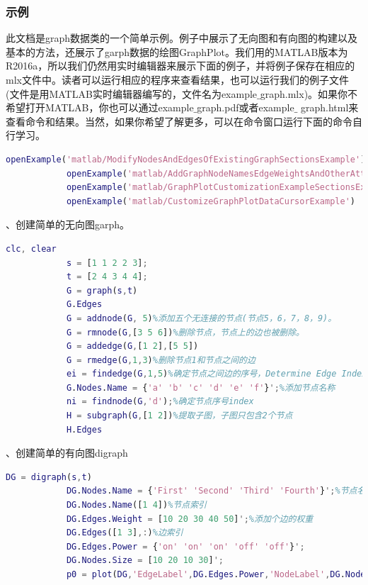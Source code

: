         \subsubsection{示例}
            \par
            此文档是graph数据类的一个简单示例。例子中展示了无向图和有向图的构建以及基本的方法，还展示了garph数据的绘图GraphPlot。我们用的MATLAB版本为R2016a，所以我们仍然用实时编辑器来展示下面的例子，并将例子保存在相应的mlx文件中。读者可以运行相应的程序来查看结果，也可以运行我们的例子文件(文件是用MATLAB实时编辑器编写的，文件名为example${\_}$graph.mlx)。如果你不希望打开MATLAB，你也可以通过example${\_}$graph.pdf或者example${\_}$ graph.html来查看命令和结果。当然，如果你希望了解更多，可以在命令窗口运行下面的命令自行学习。
            \begin{lstlisting}[language = Matlab]
            openExample('matlab/ModifyNodesAndEdgesOfExistingGraphSectionsExample')
            openExample('matlab/AddGraphNodeNamesEdgeWeightsAndOtherAttributesExample')
            openExample('matlab/GraphPlotCustomizationExampleSectionsExample')
            openExample('matlab/CustomizeGraphPlotDataCursorExample')
            \end{lstlisting}
            、创建简单的无向图garph。
            \begin{lstlisting}[language=Matlab]
            clc, clear
            s = [1 1 2 2 3];
            t = [2 4 3 4 4];
            G = graph(s,t)
            G.Edges
            G = addnode(G, 5)%添加五个无连接的节点(节点5，6，7，8，9)。
            G = rmnode(G,[3 5 6])%删除节点，节点上的边也被删除。
            G = addedge(G,[1 2],[5 5])
            G = rmedge(G,1,3)%删除节点1和节点之间的边
            ei = findedge(G,1,5)%确定节点之间边的序号，Determine Edge Index
            G.Nodes.Name = {'a' 'b' 'c' 'd' 'e' 'f'}';%添加节点名称
            ni = findnode(G,'d');%确定节点序号index
            H = subgraph(G,[1 2])%提取子图，子图只包含2个节点
            H.Edges
            \end{lstlisting}
            、创建简单的有向图digraph
            \begin{lstlisting}[language=Matlab]
            DG = digraph(s,t)
            DG.Nodes.Name = {'First' 'Second' 'Third' 'Fourth'}';%节点名称
            DG.Nodes.Name([1 4])%节点索引
            DG.Edges.Weight = [10 20 30 40 50]';%添加个边的权重
            DG.Edges([1 3],:)%边索引
            DG.Edges.Power = {'on' 'on' 'on' 'off' 'off'}';
            DG.Nodes.Size = [10 20 10 30]';
            p0 = plot(DG,'EdgeLabel',DG.Edges.Power,'NodeLabel',DG.Nodes.Size)
            \end{lstlisting}

